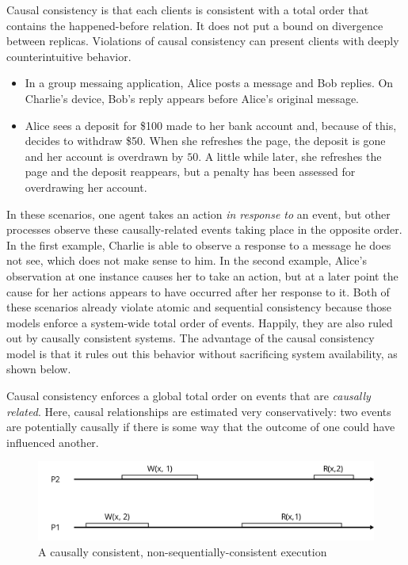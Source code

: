 \documentclass[]             %
{NASA}                       %
\theoremstyle{definition}
\providecommand{\tightlist}{%
  \setlength{\itemsep}{0pt}\setlength{\parskip}{0pt}}
\begin{document}
Causal consistency is that each clients is consistent with a total order
that contains the happened-before relation. It does not put a bound on
divergence between replicas. Violations of causal consistency can
present clients with deeply counterintuitive behavior.

\begin{itemize}
  \tightlist
\item
  In a group messaing application, Alice posts a message and Bob
  replies. On Charlie's device, Bob's reply appears before Alice's
  original message.
\item
  Alice sees a deposit for \$100 made to her bank account and, because
  of this, decides to withdraw \$50. When she refreshes the page, the
  deposit is gone and her account is overdrawn by \(50\). A little while
  later, she refreshes the page and the deposit reappears, but a penalty
  has been assessed for overdrawing her account.
\end{itemize}

In these scenarios, one agent takes an action \emph{in response to} an
event, but other processes observe these causally-related events taking
place in the opposite order. In the first example, Charlie is able to
observe a response to a message he does not see, which does not make
sense to him. In the second example, Alice's observation at one instance
causes her to take an action, but at a later point the cause for her
actions appears to have occurred after her response to it. Both of these
scenarios already violate atomic and sequential consistency because
those models enforce a system-wide total order of events. Happily, they
are also ruled out by causally consistent systems. The advantage of the
causal consistency model is that it rules out this behavior without
sacrificing system availability, as shown below.

Causal consistency enforces a global total order on events that are
\emph{causally related}. Here, causal relationships are estimated very
conservatively: two events are potentially causally if there is some way
that the outcome of one could have influenced another.

\begin{figure}
  \center
  \includegraphics[scale=0.4]{images/causal1.png}
  \caption{A causally consistent, non-sequentially-consistent execution}
\end{figure}
\end{document}
